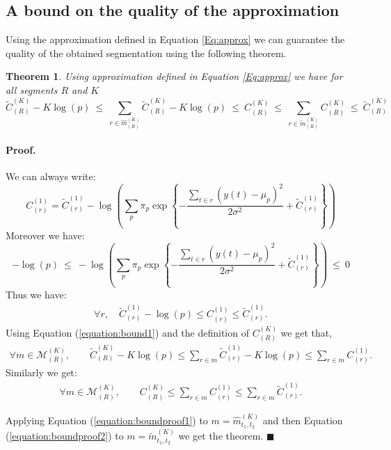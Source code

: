 \documentclass{llncs}
\newtheorem{theo}{Theorem}[section]    %
\begin{document}
\subsection{A bound on the quality of the approximation }
Using the approximation defined in Equation \ref{Eq:approx} we can guarantee the quality of the obtained segmentation using the following theorem.
\begin{theo}
Using approximation defined in Equation \ref{Eq:approx} we have for all segments $R$ and $K$
$$ \widetilde{C}_{(R)}^{(K)} - K \log(p) 
\ \leq \ 
\underset{r \in \widehat{m}_{(R)}^{(K)}}{\operatorname{\sum}} \widetilde{C}_{(R)}^{(K)} - K \log(p) 
\ \leq \ 
{C}_{(R)}^{(K)} 
\ \leq \ 
\underset{r \in \widetilde{m}_{(R)}^{(K)}}{\operatorname{\sum}} {C}_{(R)}^{(K)} 
\ \leq \ 
\widetilde{C}_{(R)}^{(K)} $$
\label{theo:theoapprox}
\end{theo}

\paragraph{Proof.} 
We can always write:
$$ {C}_{(r)}^{(1)} = \widetilde{C}_{(r)}^{(1)} - \log\left(\sum_p \pi_p \exp \left\{ -\frac{\sum_{t \in r} (y(t)- \mu_p)^2 }{ 2 \sigma^2} +\widetilde{C}_{(r)}^{(1)} \right\}\right)$$
Moreover we have:
$$-\log(p) \ \leq \ 
- \log\left(\sum_p \pi_p \exp \left\{ -\frac{\sum_{t \in r} (y(t) - \mu_p)^2 }{ 2 \sigma^2} +\widetilde{C}_{(r)}^{(1)} \right\}\right)
\ \leq \  
0$$
Thus we have:
\begin{eqnarray}
\forall r,  \quad \widetilde{C}_{(r)}^{(1)} -\log(p) \leq {C}_{(r)}^{(1)} \leq \widetilde{C}_{(r)}^{(1)} \label{equation:bound1}.
\end{eqnarray}
Using Equation (\ref{equation:bound1}) and the definition of ${C}_{(R)}^{(K)}$ we get that, 
\begin{eqnarray} 
\forall m \in \mathcal{M}^{(K)}_{(R)}, \qquad
\widetilde{C}_{(R)}^{(K)} - K\log(p) \leq \sum_{r \in m} \widetilde{C}_{(r)}^{(1)} - K \log(p) \leq   \sum_{r \in m} {C}_{(r)}^{(1)} .
\label{equation:boundproof1}\end{eqnarray}
Similarly we get:
\begin{eqnarray} 
\forall m \in \mathcal{M}^{(K)}_{(R)}, \qquad
{C}_{(R)}^{(K)} \leq \sum_{r \in m} {C}_{(r)}^{(1)} \leq   \sum_{r \in m} \widetilde{C}_{(r)}^{(1)} .
\label{equation:boundproof2}\end{eqnarray}

Applying Equation (\ref{equation:boundproof1}) to $m = \widehat{m}_{t_1, t_2}^{(K)}$ and then Equation (\ref{equation:boundproof2})
to $m =  \widetilde{m}_{t_1, t_2}^{(K)}$ we get the theorem. $\blacksquare$
\end{document}
